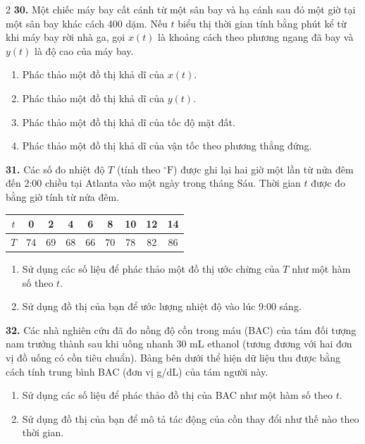 \begin{multicols}{2}
\vspace{0.15cm}
\noindent
\textbf{30.} Một chiếc máy bay cất cánh từ một sân bay và hạ cánh sau đó một giờ tại một sân bay khác cách 400 dặm. Nếu $t$ biểu thị thời gian tính bằng phút kể từ khi máy bay rời nhà ga, gọi $x(t)$ là khoảng cách theo phương ngang đã bay và $y(t)$ là độ cao của máy bay.
\begin{enumerate}[label=(\alph*), itemsep=1pt, topsep=2pt, leftmargin=*]
\item Phác thảo một đồ thị khả dĩ của $x(t)$.
\item Phác thảo một đồ thị khả dĩ của $y(t)$.
\item Phác thảo một đồ thị khả dĩ của tốc độ mặt đất.
\item Phác thảo một đồ thị khả dĩ của vận tốc theo phương thẳng đứng.
\end{enumerate}

\columnbreak

\noindent
\textbf{31.} Các số đo nhiệt độ $T$ (tính theo $^\circ\text{F}$) được ghi lại hai giờ một lần từ nửa đêm đến 2:00 chiều tại Atlanta vào một ngày trong tháng Sáu. Thời gian $t$ được đo bằng giờ tính từ nửa đêm.

\begin{center}
\setlength{\tabcolsep}{3.5pt}
\begin{tabular}{|c|c|c|c|c|c|c|c|c|}
\hline
$t$ & 0 & 2 & 4 & 6 & 8 & 10 & 12 & 14 \\ \hline
$T$ & 74 & 69 & 68 & 66 & 70 & 78 & 82 & 86 \\ \hline
\end{tabular}
\end{center}

\begin{enumerate}[label=(\alph*), itemsep=1pt, topsep=2pt, leftmargin=*]
\item Sử dụng các số liệu để phác thảo một đồ thị ước chừng của $T$ như một hàm số theo $t$.
\item Sử dụng đồ thị của bạn để ước lượng nhiệt độ vào lúc 9:00 sáng.
\end{enumerate}

\vspace{0.15cm}
\noindent
\textbf{32.} Các nhà nghiên cứu đã đo nồng độ cồn trong máu (BAC) của tám đối tượng nam trưởng thành sau khi uống nhanh 30 mL ethanol (tương đương với hai đơn vị đồ uống có cồn tiêu chuẩn). Bảng bên dưới thể hiện dữ liệu thu được bằng cách tính trung bình BAC (đơn vị g/dL) của tám người này.
\begin{enumerate}[label=(\alph*), itemsep=1pt, topsep=2pt, leftmargin=*]
\item Sử dụng các số liệu để phác thảo đồ thị của BAC như một hàm số theo $t$.
\item Sử dụng đồ thị của bạn để mô tả tác động của cồn thay đổi như thế nào theo thời gian.
\end{enumerate}


\end{multicols}
